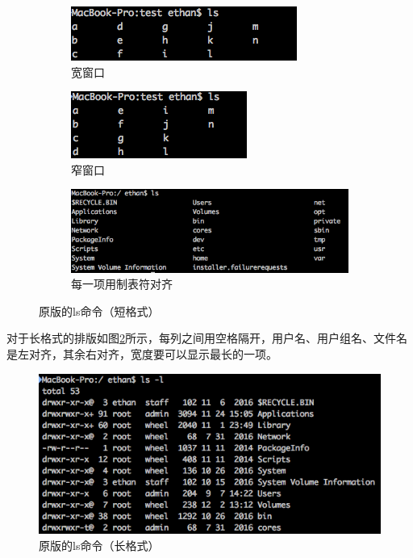 \documentclass[UTF8,zihao=5,AutoFakeBold]{ctexart}
\begin{document}
\begin{figure}[h]
    \centering
    \begin{subfigure}[b]{0.4\linewidth}
        \includegraphics[width=\linewidth]{origin_ls1}
        \caption{宽窗口}
      \end{subfigure}
      \begin{subfigure}[b]{0.3\linewidth}
        \includegraphics[width=\linewidth]{origin_ls2}
        \caption{窄窗口}
      \end{subfigure}
      \begin{subfigure}[b]{0.7\linewidth}
        \includegraphics[width=\linewidth]{origin_ls3}
        \caption{每一项用制表符对齐}
      \end{subfigure}
    \caption{原版的ls命令（短格式）}
    \label{fig:origin_ls}
\end{figure}

对于长格式的排版如图\ref{fig:origin_ls_long_format}所示，每列之间用空格隔开，用户名、用户组名、文件名是左对齐，其余右对齐，宽度要可以显示最长的一项。

\begin{figure}[h]
    \centering
    \includegraphics[width=0.7\linewidth]{origin_ls_long_format}
    \caption{原版的ls命令（长格式）}
    \label{fig:origin_ls_long_format}
\end{figure}
\end{document}
